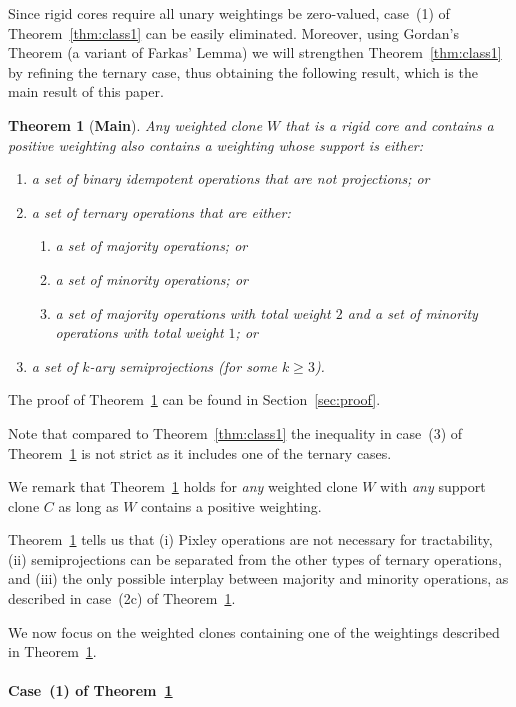 \documentclass[11pt, reqno]{article}
\newtheorem{theorem}{Theorem}%
\theoremstyle{remark}
\begin{document}
Since rigid cores require all unary weightings be zero-valued, case~(1) of
Theorem~\ref{thm:class1} can be easily eliminated. Moreover, using Gordan's
Theorem (a variant of Farkas' Lemma) we will strengthen Theorem~\ref{thm:class1}
by refining the ternary case, thus obtaining the following result, which is the
main result of this paper.

\begin{theorem}[\textbf{Main}]\label{thm:class2}
%
Any weighted clone $W$ that is a rigid core and contains a positive weighting
also contains a weighting whose support is either:
\begin{enumerate}
  \item a set of binary idempotent operations that are not projections; or
  \item a set of ternary operations that are either:
  \begin{enumerate}
   \item a set of majority operations; or
   \item a set of minority operations; or
  \item  a set of majority operations with total weight $2$ and a set
  of minority operations with total weight $1$; or
  \end{enumerate}
  \item a set of $k$-ary semiprojections (for some $k \geq 3$).
\end{enumerate}
%
\end{theorem}

The proof of Theorem~\ref{thm:class2} can be found in Section~\ref{sec:proof}.

Note that compared to Theorem~\ref{thm:class1} the inequality in case~(3) of 
Theorem~\ref{thm:class2} is not strict as it includes one of the ternary cases.

We remark that Theorem~\ref{thm:class2} holds for \emph{any} weighted clone $W$
with \emph{any} support clone $C$ as long as $W$ contains a positive weighting.

Theorem~\ref{thm:class2} tells us that (i) Pixley operations are not necessary
for tractability, (ii) semiprojections can be separated from the other types of
ternary operations,  and (iii) the only possible interplay between majority and
minority operations, as described in case~(2c) of Theorem~\ref{thm:class2}. 

We now focus on the weighted clones containing one of the weightings described
in Theorem~\ref{thm:class2}.

\paragraph{Case~(1) of Theorem~\ref{thm:class2}}
\end{document}
